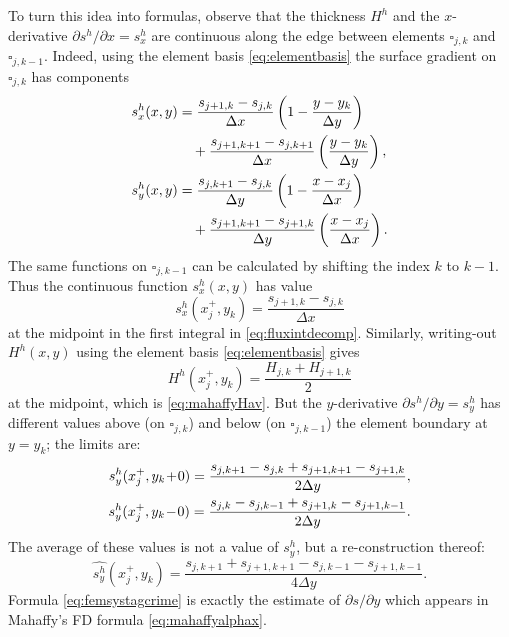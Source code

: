 \documentclass[twocolumn,letterpaper]{igs}
\begin{document}
To turn this idea into formulas, observe that the thickness $H^h$ and the $x$-derivative $\partial s^h/\partial x = s^h_x$ are continuous along the edge between elements $\square_{j,k}$ and $\square_{j,k-1}$.  Indeed, using the element basis \eqref{eq:elementbasis} the surface gradient on $\square_{j,k}$ has components
\begin{align}
s^h_x(x,y) &= \frac{s_{j+1,k}-s_{j,k}}{\Delta x} \left(1-\frac{y-y_k}{\Delta y}\right)  \label{eq:grads} \\
   &\quad + \frac{s_{j+1,k+1}-s_{j,k+1}}{\Delta x} \left(\frac{y-y_k}{\Delta y}\right), \notag \\
s^h_y(x,y) &= \frac{s_{j,k+1}-s_{j,k}}{\Delta y} \left(1-\frac{x-x_j}{\Delta x}\right) \notag \\
   &\quad + \frac{s_{j+1,k+1}-s_{j+1,k}}{\Delta y} \left(\frac{x-x_j}{\Delta x}\right). \notag
\end{align}
The same functions on $\square_{j,k-1}$ can be calculated by shifting the index $k$ to $k-1$.  Thus the continuous function $s^h_x(x,y)$ has value
\begin{equation}
s^h_x(x_j^+,y_k) = \frac{s_{j+1,k}-s_{j,k}}{\Delta x} \label{eq:femsxstag}
\end{equation}
at the midpoint in the first integral in \eqref{eq:fluxintdecomp}.  Similarly, writing-out $H^h(x,y)$ using the element basis \eqref{eq:elementbasis} gives
\begin{equation}
H^h(x_j^+,y_k) = \frac{H_{j,k}+H_{j+1,k}}{2} \label{eq:femHstag}
\end{equation}
at the midpoint, which is \eqref{eq:mahaffyHav}.  But the $y$-derivative $\partial s^h/\partial y = s^h_y$ has different values above (on $\square_{j,k}$) and below (on $\square_{j,k-1}$) the element boundary at $y = y_k$; the limits are:
\begin{align}
s^h_y(x_j^+,y_k\!+\!0) = \frac{s_{j,k+1}-s_{j,k} + s_{j+1,k+1}-s_{j+1,k}}{2\Delta y}, \\
s^h_y(x_j^+,y_k\!-\!0) = \frac{s_{j,k}-s_{j,k-1} + s_{j+1,k}-s_{j+1,k-1}}{2\Delta y}. \notag
\end{align}
The average of these values is not a value of $s_y^h$, but a re-construction thereof:
\begin{equation}
\widehat{s^h_y}(x_j^+,y_k) = \frac{s_{j,k+1} + s_{j+1,k+1} - s_{j,k-1} - s_{j+1,k-1}}{4\Delta y}. \label{eq:femsystagcrime}
\end{equation}
Formula \eqref{eq:femsystagcrime} is exactly the estimate of $\partial s/\partial y$ which appears in Mahaffy's FD formula \eqref{eq:mahaffyalphax}.
\end{document}
